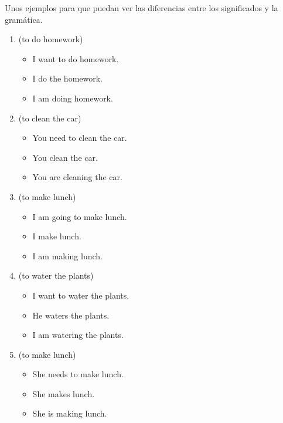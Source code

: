 Unos ejemplos para que puedan ver las diferencias entre los significados y la gramática.
\begin{enumerate}
	\item {} (to do homework)
		\begin{itemize}
			\item {} \arr I want to do homework.
			\item {} \arr I do the homework.
			\item {} \arr I am doing homework.
		\end{itemize}
	\item {} (to clean the car)
		\begin{itemize}
			\item {} \arr You need to clean the car.
			\item {} \arr You clean the car.
			\item {} \arr You are cleaning the car.
		\end{itemize}
	\item {} (to make lunch)
		\begin{itemize}
			\item {} \arr I am going to make lunch.
			\item {} \arr I make lunch.
			\item {} \arr I am making lunch.
		\end{itemize}
	\item {} (to water the plants)
		\begin{itemize}
			\item {} \arr I want to water the plants.
			\item {} \arr He waters the plants.
			\item {} \arr I am watering the plants.
		\end{itemize}
	\item {} (to make lunch)
		\begin{itemize}
			\item {} \arr She needs to make lunch.
			\item {} \arr She makes lunch.
			\item {} \arr She is making lunch.

\end{itemize}
\end{enumerate}
